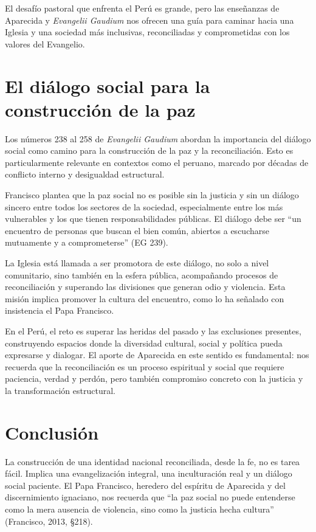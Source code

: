 \documentclass[12pt]{article}
\begin{document}
El desafío pastoral que enfrenta el Perú es grande, pero las enseñanzas de Aparecida y \textit{Evangelii Gaudium} nos ofrecen una guía para caminar hacia una Iglesia y una sociedad más inclusivas, reconciliadas y comprometidas con los valores del Evangelio.

\section{El diálogo social para la construcción de la paz}

Los números 238 al 258 de \textit{Evangelii Gaudium} abordan la importancia del diálogo social como camino para la construcción de la paz y la reconciliación. Esto es particularmente relevante en contextos como el peruano, marcado por décadas de conflicto interno y desigualdad estructural.

Francisco plantea que la paz social no es posible sin la justicia y sin un diálogo sincero entre todos los sectores de la sociedad, especialmente entre los más vulnerables y los que tienen responsabilidades públicas. El diálogo debe ser “un encuentro de personas que buscan el bien común, abiertos a escucharse mutuamente y a comprometerse” (EG 239).

La Iglesia está llamada a ser promotora de este diálogo, no solo a nivel comunitario, sino también en la esfera pública, acompañando procesos de reconciliación y superando las divisiones que generan odio y violencia. Esta misión implica promover la cultura del encuentro, como lo ha señalado con insistencia el Papa Francisco.

En el Perú, el reto es superar las heridas del pasado y las exclusiones presentes, construyendo espacios donde la diversidad cultural, social y política pueda expresarse y dialogar. El aporte de Aparecida en este sentido es fundamental: nos recuerda que la reconciliación es un proceso espiritual y social que requiere paciencia, verdad y perdón, pero también compromiso concreto con la justicia y la transformación estructural.

\section*{Conclusión}

La construcción de una identidad nacional reconciliada, desde la fe, no es tarea fácil. Implica una evangelización integral, una inculturación real y un diálogo social paciente. El Papa Francisco, heredero del espíritu de Aparecida y del discernimiento ignaciano, nos recuerda que ``la paz social no puede entenderse como la mera ausencia de violencia, sino como la justicia hecha cultura'' (Francisco, 2013, \S 218).
\end{document}
